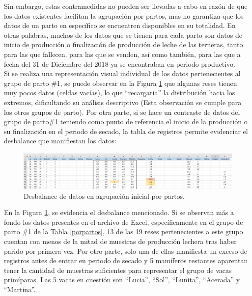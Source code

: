 Sin embargo, estas contramedidas no pueden ser llevadas a cabo en razón de que los datos existentes facilitan la agrupación por partos, mas no garantiza que los datos de un parto en específico se encuentren disponibles en su totalidad. En otras palabras, muchos de los datos que se tienen para cada parto son datos de inicio de producción o finalización de producción de leche de las terneras, tanto para las que fallecen, para las que se venden, así como también, para las que a fecha del 31 de Diciembre del 2018 ya se encontraban en periodo productivo.\\

Si se realiza una representación visual individual de los datos pertenecientes al grupo de parto \#1, se puede observar en la Figura \ref{partosincompletospng} que algunas reses tienen muy pocos datos (celdas vacías), lo que ``recargaría'' la distribución hacia los extremos, dificultando su análisis descriptivo (Esta observación se cumple para los otros grupos de parto). Por otra parte, si se hace un contraste de datos del grupo de parto\#1 teniendo como punto de referencia el inicio de la producción o su finalización en el periodo de secado, la tabla de registros permite evidenciar el desbalance que manifiestan los datos:

\begin{figure}[H]
	 \begin{center}
	 \includegraphics[scale=0.34]{img/partosincompletos.jpg}
	 \end{center}
	 \caption{Desbalance de datos en agrupación inicial por partos. \label{partosincompletospng}}
\end{figure}

En la Figura \ref{partosincompletospng}, se evidencia el desbalance mencionado. Si se observan más a fondo los datos presentes en el archivo de Excel, específicamente en el grupo de parto \#1  de la Tabla \ref{porpartos}, 13 de las 19 reses pertenecientes a este grupo cuentan con menos de la mitad de muestras de producción lechera tras haber parido por primera vez. Por otro parte, solo una de ellas manifiesta un exceso de registros antes de entrar en periodo de secado y 5 mamíferos restantes aparentan tener la cantidad de muestras suficientes para representar el grupo de vacas primíparas. Las 5 vacas en cuestión son ``Lucia'', ``Sol'', ``Lunita'', ``Acerada'' y ``Martina''.\\

